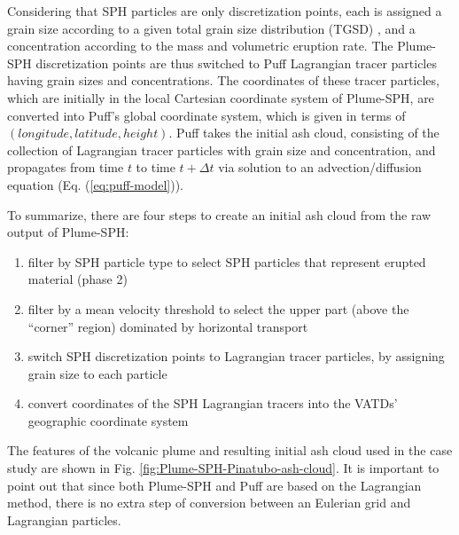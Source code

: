 \documentclass[utf8]{frontiersSCNS} %
\begin{document}
Considering that SPH particles are only discretization points, each is assigned a grain size according to a given total grain size distribution (TGSD) \citep{paladio1996tephra}, and a concentration according to the mass and volumetric eruption rate. The Plume-SPH discretization points are thus switched to Puff Lagrangian tracer particles having grain sizes and concentrations. The coordinates of these tracer particles, which are initially in the local Cartesian coordinate system of Plume-SPH, are converted into Puff's global coordinate system, which is given in terms of $(longitude, latitude, height)$. Puff takes the initial ash cloud, consisting of the collection of Lagrangian tracer particles with grain size and concentration, and propagates from time $t$ to time $t+\Delta t$ via solution to an advection/diffusion equation (Eq. (\ref{eq:puff-model})).

To summarize, there are four steps to create an initial ash cloud from the raw output of Plume-SPH:
\begin{enumerate}
\item filter by SPH particle type to select SPH particles that represent erupted material (phase 2)
\item filter by a mean velocity threshold to select the upper part (above the ``corner'' region) dominated by horizontal transport
\item switch SPH discretization points to Lagrangian tracer particles, by assigning grain size to each particle
\item convert coordinates of the SPH Lagrangian tracers into the VATDs' geographic coordinate system
\end{enumerate}
The features of the volcanic plume and resulting initial ash cloud used in the case study are shown in Fig. \ref{fig:Plume-SPH-Pinatubo-ash-cloud}. It is important to point out that since both Plume-SPH and Puff are based on the Lagrangian method, there is no extra step of conversion between an Eulerian grid and Lagrangian particles.

\end{document}
